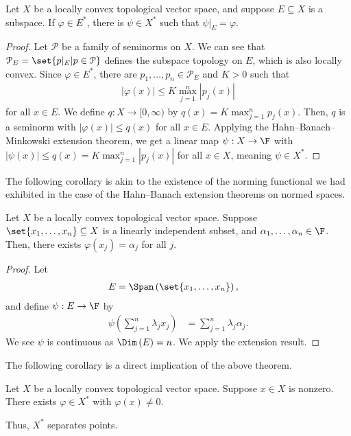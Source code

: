 \documentclass[10pt]{mypackage}
\begin{document}
\begin{theorem}
  Let $X$ be a locally convex topological vector space, and suppose $E\subseteq X$ is a subspace. If $\varphi\in E^{\ast}$, there is $\psi\in X^{\ast}$ such that $\psi|_{E} = \varphi$.
\end{theorem}
\begin{proof}
  Let $\mathcal{P}$ be a family of seminorms on $X$. We can see that $\mathcal{P}_{E} = \set{p|_{E} | p\in \mathcal{P}}$ defines the subspace topology on $E$, which is also locally convex. Since $\varphi\in E^{\ast}$, there are $p_1,\dots,p_n\in \mathcal{P}_{E}$ and $K > 0$ such that
  \begin{align*}
    \left\vert \varphi\left(x\right) \right\vert \leq K\max_{j=1}^{n}\left\vert p_j(x) \right\vert
  \end{align*}
  for all $x\in E$. We define $q: X\rightarrow [0,\infty)$ by $q(x) = K\max_{j=1}^{n}p_j\left(x\right)$. Then, $q$ is a seminorm with $\left\vert \varphi\left(x\right) \right\vert \leq q(x)$ for all $x\in E$. Applying the Hahn--Banach--Minkowski extension theorem, we get a linear map $\psi: X\rightarrow \F$ with $\left\vert \psi\left(x\right) \right\vert \leq q(x) = K\max_{j=1}^{n}\left\vert p_j\left(x\right) \right\vert$ for all $x\in X$, meaning $\psi\in X^{\ast}$.
\end{proof}
The following corollary is akin to the existence of the norming functional we had exhibited in the case of the Hahn--Banach extension theorems on normed spaces.
\begin{corollary}
  Let $X$ be a locally convex topological vector space. Suppose $\set{x_1,\dots,x_n}\subseteq X$ is a linearly independent subset, and $\alpha_1,\dots,\alpha_n\in\F$. Then, there exists $\varphi\left(x_j\right) = \alpha_j$ for all $j$.
\end{corollary}
\begin{proof}
  Let
  \begin{align*}
    E &= \Span\left(\set{x_1,\dots,x_n}\right),
  \end{align*}
  and define $\psi: E\rightarrow \F$ by
  \begin{align*}
    \psi\left(\sum_{j=1}^{n}\lambda_jx_j\right) &= \sum_{j=1}^{n}\lambda_j\alpha_j.
  \end{align*}
  We see $\psi$ is continuous as $\Dim\left(E\right) = n$. We apply the extension result.
\end{proof}
The following corollary is a direct implication of the above theorem.
\begin{corollary}
  Let $X$ be a locally convex topological vector space. Suppose $x\in X$ is nonzero. There exists $\varphi\in X^{\ast}$ with $\varphi\left(x\right) \neq 0$.\newline

  Thus, $X^{\ast}$ separates points.
\end{corollary}
\end{document}
